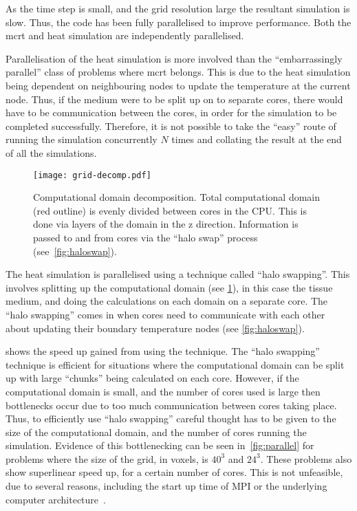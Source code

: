 As the time step is small, and the grid resolution large the resultant simulation is slow. Thus, the code has been fully parallelised to improve performance. Both the \gls*{mcrt} and heat simulation are independently parallelised. 

\medskip

Parallelisation of the heat simulation is more involved than the ``embarrassingly parallel'' class of problems where \gls*{mcrt} belongs. This is due to the heat simulation being dependent on neighbouring nodes to update the temperature at the current node. Thus, if the medium were to be split up on to separate cores, there would have to be communication between the cores, in order for the simulation to be completed successfully. Therefore, it is not possible to take the ``easy'' route of running the simulation concurrently $N$ times and collating the result at the end of all the simulations.


\begin{figure}[!htbp]
\centering
\texttt{[image: grid-decomp.pdf]}
\caption{Computational domain decomposition. Total computational domain (red outline) is evenly divided between cores in the CPU. This is done via layers of the domain in the z direction. Information is passed to and from cores via the ``halo swap'' process (see~\cref{fig:haloswap}).}
\label{fig:griddecomp}
\end{figure}

The heat simulation is parallelised using a technique called ``halo swapping''. This involves splitting up the computational domain (see \cref{fig:griddecomp}), in this case the tissue medium, and doing the calculations on each domain on a separate core. The ``halo swapping'' comes in when cores need to communicate with each other about updating their boundary temperature nodes (see \cref{fig:haloswap}).

 shows the speed up gained from using the technique. The ``halo swapping'' technique is efficient for situations where the computational domain can be split up with large ``chunks'' being calculated on each core. However, if the computational domain is small, and the number of cores used is large then bottlenecks occur due to too much communication between cores taking place. Thus, to efficiently use ``halo swapping'' careful thought has to be given to the size of the computational domain, and the number of cores running the simulation. Evidence of this bottlenecking can be seen in~\cref{fig:parallel} for problems where the size of the grid, in voxels, is $40^3$ and $24^3$. These problems also show superlinear speed up, for a certain number of cores. This is not unfeasible, due to several reasons, including the start up time of MPI or the underlying computer architecture~\cite{ristov2016superlinear}.

